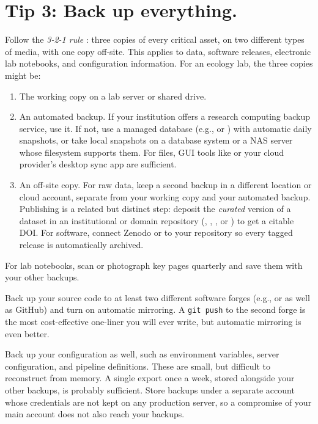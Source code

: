 \documentclass[10pt,letterpaper]{article}
\begin{document}
\section*{Tip 3: Back up everything.}

Follow the \emph{3-2-1 rule} \cite{krogh2009}: three copies of every critical
asset, on two different types of media, with one copy off-site. This applies to
data, software releases, electronic lab notebooks, and configuration
information.  For an ecology lab, the three copies might be:

\begin{enumerate}
\item
  The working copy on a lab server or shared drive.
\item
  An automated backup. If your institution offers a research computing backup
  service, use it. If not, use a managed database (e.g.,  or ) with automatic daily snapshots, or take
  local snapshots on a database system or a NAS server whose filesystem supports
  them. For files, GUI tools like  or
  your cloud provider's desktop sync app are sufficient.
\item
  An off-site copy. For raw data, keep a second backup in a different location
  or cloud account, separate from your working copy and your automated backup.
  Publishing is a related but distinct step: deposit the \emph{curated} version
  of a dataset in an institutional or domain repository
  (,
  ,
  , or ) to
  get a citable DOI. For software, connect Zenodo or
   to your repository so every tagged
  release is automatically archived.
\end{enumerate}

For lab notebooks, scan or photograph key pages quarterly and save them with
your other backups.

Back up your source code to at least two different software forges (e.g.,
 or
 as well as GitHub) and turn on
automatic mirroring. A \texttt{git push} to the second forge is the most
cost-effective one-liner you will ever write, but automatic mirroring is even
better.

Back up your configuration as well, such as environment variables, server
configuration, and pipeline definitions. These are small, but difficult to
reconstruct from memory. A single export once a week, stored alongside your
other backups, is probably sufficient. Store backups under a separate account
whose credentials are not kept on any production server, so a compromise of your
main account does not also reach your backups.
\end{document}
